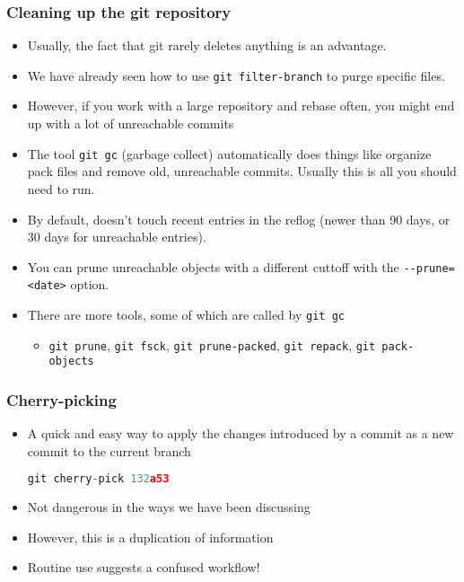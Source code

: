 \documentclass{beamer}
\begin{document}
\begin{frame}[fragile]
\frametitle{Cleaning up the git repository}
\begin{itemize}
\item Usually, the fact that git rarely deletes anything is an advantage.
\item We have already seen how to use \lstinline{git filter-branch} to purge specific files.
\item However, if you work with a large repository and rebase often, you might end up with a lot of unreachable commits
\item The tool \lstinline{git gc} (garbage collect) automatically does things like organize pack files and remove old, unreachable commits. Usually this is all you should need to run.
\item By default, doesn't touch recent entries in the reflog (newer than 90 days, or 30 days for unreachable entries).
\item You can prune unreachable objects with a different cuttoff with the \lstinline{--prune=<date>} option.
\item There are more tools, some of which are called by \lstinline{git gc}
\begin{itemize}
\item \lstinline{git prune}, \lstinline{git fsck}, \lstinline{git prune-packed}, \lstinline{git repack}, \lstinline{git pack-objects}
\end{itemize}
\end{itemize}
\end{frame}

\begin{frame}[fragile]
\frametitle{Cherry-picking}
\begin{itemize}
\item A quick and easy way to apply the changes introduced by a commit as a new commit to the current branch
\begin{lstlisting}[language=C++]
git cherry-pick 132a53
\end{lstlisting}
\item Not dangerous in the ways we have been discussing
\item However, this is a duplication of information
\item Routine use suggests a confused workflow!
\end{itemize}
\end{frame}
\end{document}
